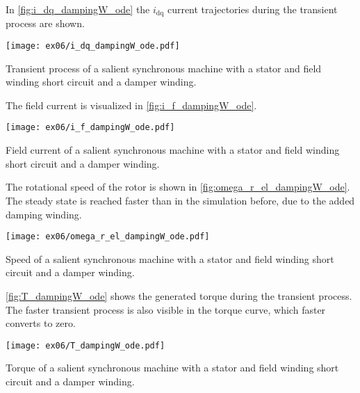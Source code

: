 \begin{solutionblock}
    In \autoref{fig:i_dq_dampingW_ode} the $i_{\mathrm{dq}}$ current trajectories during the transient process are shown.
    \begin{solutionfigure}[ht]
        \centering
        \texttt{[image: ex06/i\_dq\_dampingW\_ode.pdf]}
        \caption{Transient process of a salient synchronous machine with a stator and field winding short circuit and a damper winding.}
        \label{fig:i_dq_dampingW_ode}
    \end{solutionfigure}

    The field current is visualized in \autoref{fig:i_f_dampingW_ode}.
    \begin{solutionfigure}[ht]
        \centering
        \texttt{[image: ex06/i\_f\_dampingW\_ode.pdf]}
        \caption{Field current of a salient synchronous machine with a stator and field winding short circuit and a damper winding.}
        \label{fig:i_f_dampingW_ode}
    \end{solutionfigure}

    The rotational speed of the rotor is shown in \autoref{fig:omega_r_el_dampingW_ode}. The steady state is reached faster than in the simulation before, due to the added damping winding.
    \begin{solutionfigure}[ht]
        \centering
        \texttt{[image: ex06/omega\_r\_el\_dampingW\_ode.pdf]}
        \caption{Speed of a salient synchronous machine with a stator and field winding short circuit and a damper winding.}
        \label{fig:omega_r_el_dampingW_ode}
    \end{solutionfigure}

    \autoref{fig:T_dampingW_ode} shows the generated torque during the transient process. The faster transient process is also visible in the torque curve, which faster converts to zero.
    \begin{solutionfigure}[ht]
        \centering
        \texttt{[image: ex06/T\_dampingW\_ode.pdf]}
        \caption{Torque of a salient synchronous machine with a stator and field winding short circuit and a damper winding.}
        \label{fig:T_dampingW_ode}
    \end{solutionfigure}
\end{solutionblock}
\FloatBarrier



